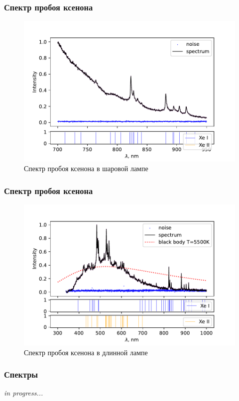 \documentclass{beamer}
\begin{document}
	\begin{frame}
		\frametitle{Спектр пробоя ксенона}
		\begin{figure}
			\centering
			\includegraphics[width=\linewidth]{gen/xe_lines_spherical.pdf}
			\caption*{Спектр пробоя ксенона в шаровой лампе}
		\end{figure}
	\end{frame}
	
	\begin{frame}
		\frametitle{Спектр пробоя ксенона}
		\begin{figure}
			\centering
			\includegraphics[width=\linewidth]{gen/xe_lines.pdf}
			\caption*{Спектр пробоя ксенона в длинной лампе}
		\end{figure}
	\end{frame}
	
	\begin{frame}
		\frametitle{Спектры}
		
		\begin{center}
			\huge {} \textit{in progress...}
		\end{center}
		
	\end{frame}
	
\end{document}

